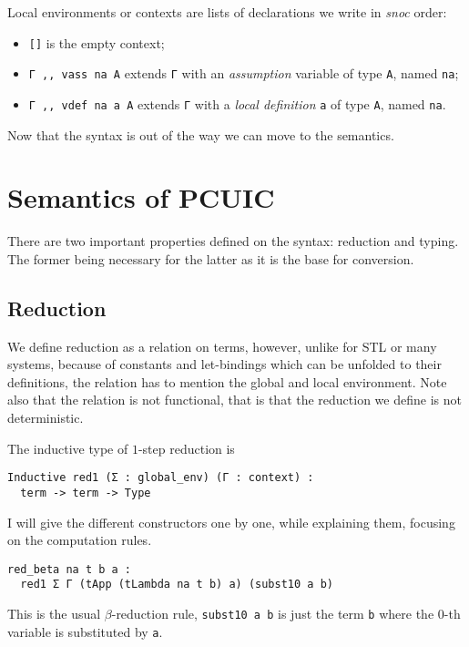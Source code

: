 Local environments or contexts are lists of declarations we write in \emph{snoc}
order:
\begin{itemize}
  \item \texttt{[]} is the empty context;
  \item \texttt{Γ ,, vass na A} extends \texttt{Γ} with
  an \emph{assumption} variable of type \texttt{A}, named
  \texttt{na};
  \item \texttt{Γ ,, vdef na a A} extends \texttt{Γ} with
  a \emph{local definition} \texttt{a} of type \texttt{A},
  named \texttt{na}.
\end{itemize}

Now that the syntax is out of the way we can move to the semantics.

\section{Semantics of \acrshort{PCUIC}}

There are two important properties defined on the syntax: reduction and typing.
The former being necessary for the latter as it is the base for conversion.

\subsection{Reduction}

We define reduction as a relation on terms, however, unlike for \acrshort{STL}
or many systems, because of constants and let-bindings which can be unfolded
to their definitions, the relation has to mention the global and local
environment. Note also that the relation is not functional, that is that the
reduction we define is not deterministic.

The inductive type of \(1\)-step reduction is
\begin{verbatim}
Inductive red1 (Σ : global_env) (Γ : context) :
  term -> term -> Type
\end{verbatim}
I will give the different constructors one by one, while explaining them,
focusing on the computation rules.

\begin{verbatim}
red_beta na t b a :
  red1 Σ Γ (tApp (tLambda na t b) a) (subst10 a b)
\end{verbatim}
This is the usual \(\beta\)-reduction rule, \texttt{subst10 a b}
is just the term \texttt{b} where the \(0\)-th variable is substituted
by \texttt{a}.

